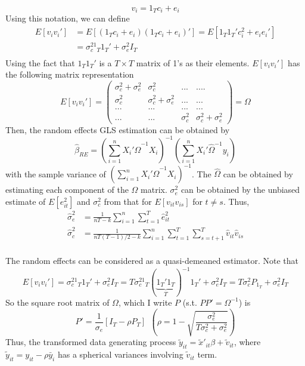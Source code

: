 \documentclass[12pt]{article}
\theoremstyle{definition}
\theoremstyle{property}
\theoremstyle{assumption}
\theoremstyle{example}
\theoremstyle{comment}
\begin{document}
\[
v_i = 1_Tc_i + e_{i}
\]
Using this notation, we can define
\[
\begin{aligned}
E[v_iv_i']&=E\left[(1_Tc_i + e_i)(1_Tc_i + e_i)'\right]=E[1_T1_T'c_i^2+e_ie_i']\\
&=\sigma_c^21_T1_T'+\sigma_e^2I_T\\
\end{aligned}
\]
Using the fact that $1_T1_T'$ is a $T\times T$ matrix of 1's as their elements. $E[v_iv_i']$ has the following matrix representation
\[
E[v_iv_i']=\begin{pmatrix}\sigma_c^2+\sigma_e^2 & \sigma_c^2 & ... &.... \\ \sigma_c^2 & \sigma_c^2+\sigma_e^2 &...&...\\ ...&...&...&...\\ ... &...&\sigma_c^2&\sigma_c^2+\sigma_e^2\end{pmatrix} =\Omega
\]
Then, the random effects GLS estimation can be obtained by
\[
\hat{\beta}_{RE} = \left(\sum_{i=1}^n X_i'\widehat{\Omega}^{-1}X_i\right)^{-1}\left(\sum_{i=1}^n X_i'\widehat{\Omega}^{-1}y_i\right)
\]
with the sample variance of $\left(\sum_{i=1}^n X_i'\widehat{\Omega}^{-1}X_i\right)^{-1}$. The $\widehat{\Omega}$ can be obtained by estimating each component of the $\Omega$ matrix. $\sigma_e^2$ can be obtained by the unbiased estimate of $E[e_{it}^2]$ and $\sigma_c^2$ from that for $E[v_{it}v_{is}]$ for $t\neq s$. Thus, 
\[
\begin{aligned}
\hat{\sigma}_e^2&=\frac{1}{nT-k}\sum_{i=1}^n\sum_{t=1}^T \hat{e}_{it}^2\\
\hat{\sigma}_c^2&=\frac{1}{nT(T-1)/2-k}\sum_{i=1}^n\sum_{t=1}^T\sum_{s=t+1}^T \hat{v}_{it}\hat{v}_{is}\\
\end{aligned}
\]
\par
The random effects can be considered as a quasi-demeaned estimator. Note that 
\[
E[v_iv_i']=\sigma_c^21_T1_T'+\sigma_e^2I_T=T\sigma_c^21_T(\underbrace{1_T'1_T}_{T})^{-1}1_T'+\sigma_e^2I_T=T\sigma_c^2P_{1_T}+\sigma_e^2I_T
\]
So the square root matrix of $\Omega$, which I write $P$ (s.t. $PP'=\Omega^{-1}$) is
\[
P'=\frac{1}{\sigma_e}[I_T - \rho P_T] \ \ \left(\rho = 1-\sqrt{\frac{\sigma_e^2}{T\sigma_c^2+\sigma_e^2}}\right)
\]
Thus, the transformed data generating process $\tilde{y}_{it}=\tilde{x}'_{it}\beta+\tilde{v}_{it}$, where $\tilde{y}_{it}=y_{it}-\rho\bar{y}_i$ has a spherical variances involving $\tilde{v}_{it}$ term.
\end{document}
